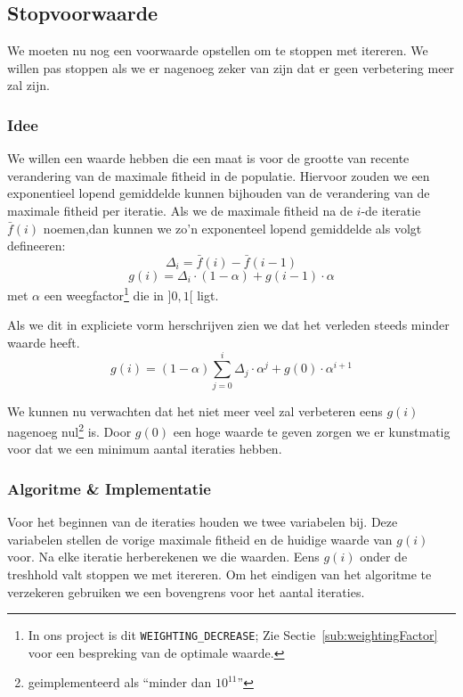 %
\subsection{Stopvoorwaarde}
\label{ssub:stop_cond}
We moeten nu nog een voorwaarde opstellen om te stoppen met itereren. We willen pas stoppen als we er nagenoeg zeker van zijn dat er geen verbetering meer zal zijn.
\subsubsection{Idee}
We willen een waarde hebben die een maat is voor de grootte van recente verandering van de maximale fitheid in de populatie. Hiervoor zouden we een exponentieel lopend gemiddelde kunnen bijhouden van de verandering van de maximale fitheid per iteratie. Als we de maximale fitheid na de $i$-de iteratie $\bar f(i)$ noemen,dan kunnen we zo'n exponenteel lopend gemiddelde als volgt defineeren:
\[\Delta_i = \bar f(i) - \bar f(i-1)\]
\[g(i) =  \Delta_i \cdot (1-\alpha) + g(i-1)\cdot \alpha\]
met $\alpha$ een weegfactor\footnote{In ons project is dit \texttt{WEIGHTING\_DECREASE}; Zie Sectie~\ref{sub:weightingFactor} voor een bespreking van de optimale waarde.} die in $\rbrack 0,1 \lbrack$ ligt.

Als we dit in expliciete vorm herschrijven zien we dat het verleden steeds minder waarde heeft.
\[g(i) = (1-\alpha) \sum^i_{j=0} \Delta_j \cdot \alpha^j + g(0)\cdot \alpha^{i+1}\]

We kunnen nu verwachten dat het niet meer veel zal verbeteren eens $g(i)$ nagenoeg nul\footnote{geimplementeerd als ``minder dan $10^{11}$''} is. Door $g(0)$ een hoge waarde te geven zorgen we er kunstmatig voor dat we een minimum aantal iteraties hebben. 
 
\subsubsection{Algoritme \& Implementatie}
Voor het beginnen van de iteraties houden we twee variabelen bij. Deze variabelen stellen de vorige maximale fitheid en de huidige waarde van $g(i)$ voor. Na elke iteratie herberekenen we die waarden. Eens $g(i)$ onder de treshhold valt stoppen we met itereren. Om het eindigen van het algoritme te verzekeren gebruiken we een bovengrens voor het aantal iteraties.
 
%